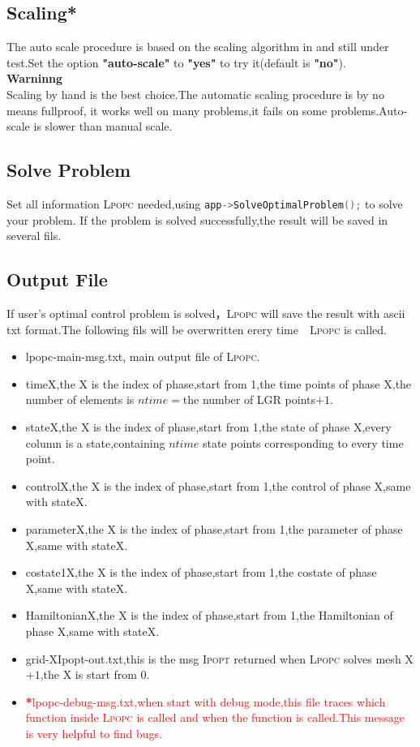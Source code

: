 \documentclass[10pt]{article}
\newcommand{\Ipopt}{\textsc{Ipopt}\xspace}
\newcommand{\LPOPC}{\textsc{Lpopc}\xspace}
\begin{document}
	\subsection{Scaling*}
	The auto scale procedure is based on the scaling algorithm in\cite{Betts2009} and still under test.Set the option \textbf{"auto-scale"} to \textbf{"yes"} to try it(default is \textbf{"no"}).\\
	\textbf{Warninng}\\
	Scaling by hand is the best choice.The automatic scaling procedure is by no means fullproof, it works well on many problems,it fails on some problems.Auto-scale is slower than manual scale.
	\subsection{Solve Problem}
	Set all information \LPOPC needed,using 
	\lstinline[language=C++]|app->SolveOptimalProblem();| to solve your problem.
	If the problem is solved successfully,the result will be saved in several fils.
	
	\subsection{Output File}
	If user's optimal control problem is solved，\LPOPC will save the result with ascii txt format.The following fils will be overwritten erery time　\LPOPC is called.
	\begin{itemize}
		\item lpopc-main-msg.txt, main output file of \LPOPC.
		\item timeX,the X is the index of phase,start from 1,the time points of phase X,the number of elements is $ntime=$the number of LGR points$ +1$.
		\item stateX,the X is the index of phase,start from 1,the state of phase X,every column is a state,containing $ntime$ state points corresponding to every time point.
		\item controlX,the X is the index of phase,start from 1,the control of phase X,same with stateX.
		\item parameterX,the X is the index of phase,start from 1,the parameter of phase X,same with stateX.
		\item costate1X,the X is the index of phase,start from 1,the costate of phase X,same with stateX.
		\item HamiltonianX,the X is the index of phase,start from 1,the Hamiltonian of phase X,same with stateX.
		\item grid-XIpopt-out.txt,this is the msg \Ipopt returned when \LPOPC solves mesh X$+1$,the X is start from 0.
		\item \textcolor{red}{\textbf{*}lpopc-debug-msg.txt,when start with debug mode,this file traces which function inside \LPOPC is called and when the function is called.This message is very helpful to find bugs.}
	\end{itemize} 
\end{document}
